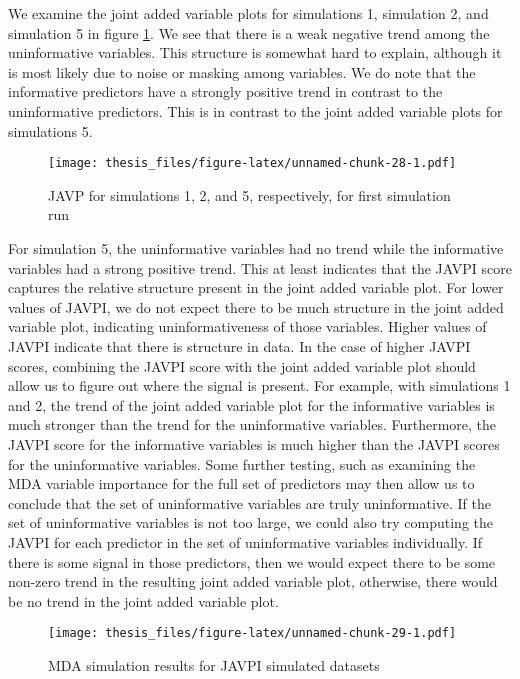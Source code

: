\documentclass[12pt,twoside]{reedthesis}
\theoremstyle{definition}
\theoremstyle{definition}
\theoremstyle{definition}
\theoremstyle{remark}
\begin{document}
We examine the joint added variable plots for simulations 1, simulation
2, and simulation 5 in figure \ref{siml1to5plots}. We see that there is
a weak negative trend among the uninformative variables. This structure
is somewhat hard to explain, although it is most likely due to noise or
masking among variables. We do note that the informative predictors have
a strongly positive trend in contrast to the uninformative predictors.
This is in contrast to the joint added variable plots for simulations 5.
\par 
\begin{figure}
\centering
\texttt{[image: thesis\_files/figure-latex/unnamed-chunk-28-1.pdf]}
\caption{\label{fig:unnamed-chunk-28}\label{siml1to5plots}JAVP for
simulations 1, 2, and 5, respectively, for first simulation run}
\end{figure}
For simulation 5, the uninformative variables had no trend while the
informative variables had a strong positive trend. This at least
indicates that the JAVPI score captures the relative structure present
in the joint added variable plot. For lower values of JAVPI, we do not
expect there to be much structure in the joint added variable plot,
indicating uninformativeness of those variables. Higher values of JAVPI
indicate that there is structure in data. In the case of higher JAVPI
scores, combining the JAVPI score with the joint added variable plot
should allow us to figure out where the signal is present. For example,
with simulations 1 and 2, the trend of the joint added variable plot for
the informative variables is much stronger than the trend for the
uninformative variables. Furthermore, the JAVPI score for the
informative variables is much higher than the JAVPI scores for the
uninformative variables. Some further testing, such as examining the MDA
variable importance for the full set of predictors may then allow us to
conclude that the set of uninformative variables are truly
uninformative. If the set of uninformative variables is not too large,
we could also try computing the JAVPI for each predictor in the set of
uninformative variables individually. If there is some signal in those
predictors, then we would expect there to be some non-zero trend in the
resulting joint added variable plot, otherwise, there would be no trend
in the joint added variable plot. \par 
\begin{figure}
\centering
\texttt{[image: thesis\_files/figure-latex/unnamed-chunk-29-1.pdf]}
\caption{\label{fig:unnamed-chunk-29}\label{MDAforJAVPI} MDA simulation
results for JAVPI simulated datasets}
\end{figure}
\end{document}
